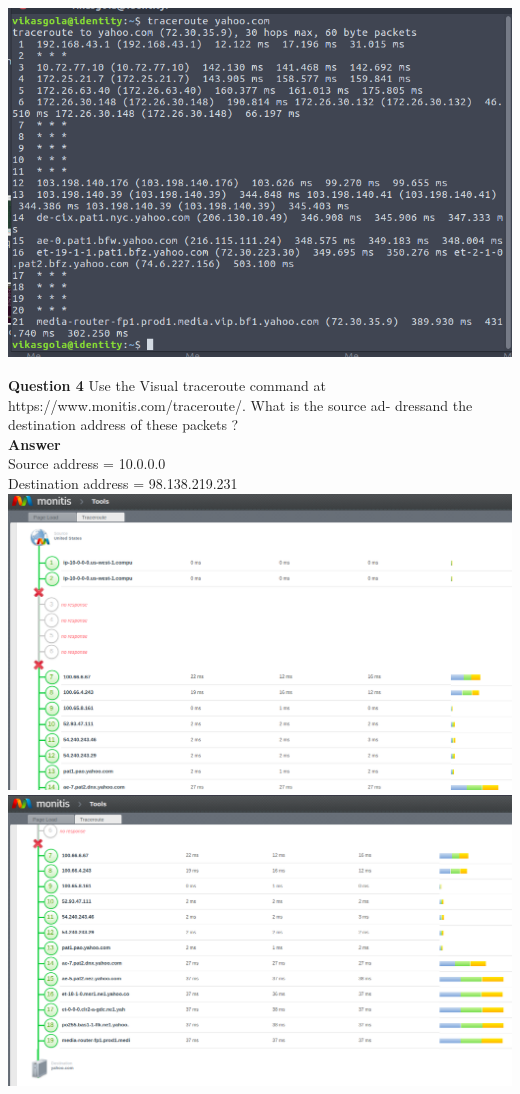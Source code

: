 \documentclass[14pt]{extarticle}
\begin{document}
    \\[10pt]
    \includegraphics[scale=0.6]{3_2}\\
    \vspace{1cm}


    \noindent
    \textbf{\large Question 4}
    Use the Visual traceroute command at https://www.monitis.com/traceroute/. What is the source ad-
    dressand the destination address of these packets ?\\[10pt]
    \textbf{\large Answer}\\
    Source address = 10.0.0.0\\
    Destination address = 98.138.219.231\\[10pt]
    \includegraphics[scale=0.4]{4-1}
    \\[10pt]
    \includegraphics[scale=0.4]{4-2}
    \vspace{1cm}
\end{document}
